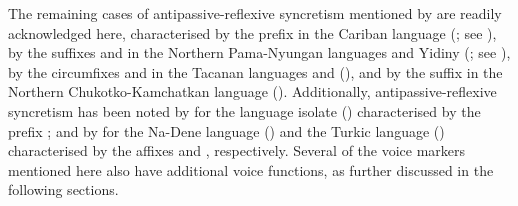 The remaining cases of antipassive-reflexive syncretism mentioned by \cite{janic:2010} are readily acknowledged here, characterised by the prefix  in the Cariban language  (; see \citealt{gildea:al:2016}),  by the suffixes  and  in the Northern Pama-Nyungan languages  and Yidiny (; see \citealt{terrill:1997}), by the circumfixes  and  in the Tacanan languages  and  (), and by the suffix  in the Northern Chukotko-Kamchatkan language  (). Additionally, antipassive-reflexive syncretism has been noted by \cite[75ff.]{vigus:2016} for the language isolate  () characterised by the prefix ; and by \cite[193ff.]{sanso:2017} for the Na-Dene language  () and the Turkic language  () characterised by the affixes  and , respectively. Several of the voice markers mentioned here also have additional voice functions, as further discussed in the following sections.

